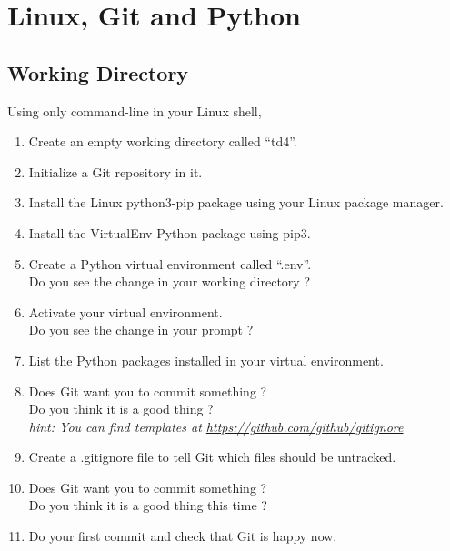 
\setcounter{section}{3}



\section{Linux, Git and Python}

\subsection{Working Directory}  %

Using only command-line in your Linux shell,
\begin{enumerate}
    \item Create an empty working directory called ``td4''.
    \item Initialize a Git repository in it.
    \item Install the Linux python3-pip package using your Linux package manager.
    \item Install the VirtualEnv Python package using pip3.
    \item Create a Python virtual environment called ``.env''. \\
          Do you see the change in your working directory ?
    \item Activate your virtual environment. \\
          Do you see the change in your prompt ?
    \item List the Python packages installed in your virtual environment.
    \item Does Git want you to commit something ? \\
          Do you think it is a good thing ? \\
          \textit{hint: You can find templates at \href{https://github.com/github/gitignore}
          {https://github.com/github/gitignore}}
    \item Create a .gitignore file to tell Git which files should be untracked.
    \item Does Git want you to commit something ? \\
          Do you think it is a good thing this time ?
    \item Do your first commit and check that Git is happy now.
\end{enumerate}

